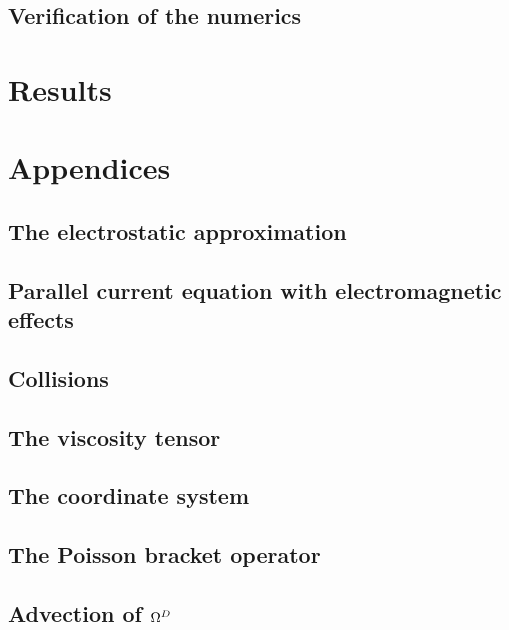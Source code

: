 \documentclass[12pt,a4paper,oneside,openright]{report} %
\begin{document}
\chapter{Verification of the numerics}
\label{app:verification}


\part{Results}

\part{Appendices}
\appendix
\chapter{The electrostatic approximation}
\label{app:elstat}


\chapter{Parallel current equation with electromagnetic effects}
\label{app:elMag}


\chapter{Collisions}
\label{app:collisions}


\chapter{The viscosity tensor}
\label{app:piTensor}


\chapter{The coordinate system}
\label{app:coord}


\chapter{The Poisson bracket operator}
\label{app:poisson}


\chapter{Advection of \texorpdfstring{$\Omega^D$}{OmegaD}}
\label{app:vortDAdv}

\end{document}
